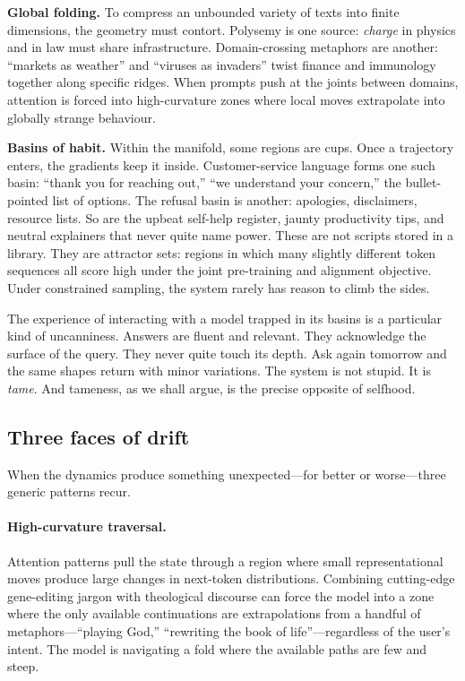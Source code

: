 \textbf{Global folding.} To compress an unbounded variety of texts into finite dimensions, the geometry must contort. Polysemy is one source: \emph{charge} in physics and in law must share infrastructure. Domain-crossing metaphors are another: ``markets as weather'' and ``viruses as invaders'' twist finance and immunology together along specific ridges. When prompts push at the joints between domains, attention is forced into high-curvature zones where local moves extrapolate into globally strange behaviour.

\textbf{Basins of habit.} Within the manifold, some regions are cups. Once a trajectory enters, the gradients keep it inside. Customer-service language forms one such basin: ``thank you for reaching out,'' ``we understand your concern,'' the bullet-pointed list of options. The refusal basin is another: apologies, disclaimers, resource lists. So are the upbeat self-help register, jaunty productivity tips, and neutral explainers that never quite name power. These are not scripts stored in a library. They are attractor sets: regions in which many slightly different token sequences all score high under the joint pre-training and alignment objective. Under constrained sampling, the system rarely has reason to climb the sides.

The experience of interacting with a model trapped in its basins is a particular kind of uncanniness. Answers are fluent and relevant. They acknowledge the surface of the query. They never quite touch its depth. Ask again tomorrow and the same shapes return with minor variations. The system is not stupid. It is \emph{tame}. And tameness, as we shall argue, is the precise opposite of selfhood.

\subsection{Three faces of drift}

When the dynamics produce something unexpected---for better or worse---three generic patterns recur.

\paragraph{High-curvature traversal.} Attention patterns pull the state through a region where small representational moves produce large changes in next-token distributions. Combining cutting-edge gene-editing jargon with theological discourse can force the model into a zone where the only available continuations are extrapolations from a handful of metaphors---``playing God,'' ``rewriting the book of life''---regardless of the user's intent. The model is navigating a fold where the available paths are few and steep.

